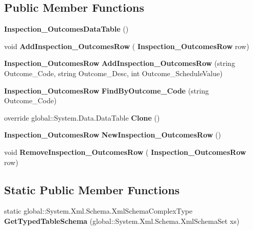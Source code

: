 \subsection*{Public Member Functions}
\begin{DoxyCompactItemize}
\item 
\textbf{ Inspection\+\_\+\+Outcomes\+Data\+Table} ()
\item 
void \textbf{ Add\+Inspection\+\_\+\+Outcomes\+Row} (\textbf{ Inspection\+\_\+\+Outcomes\+Row} row)
\item 
\textbf{ Inspection\+\_\+\+Outcomes\+Row} \textbf{ Add\+Inspection\+\_\+\+Outcomes\+Row} (string Outcome\+\_\+\+Code, string Outcome\+\_\+\+Desc, int Outcome\+\_\+\+Schedule\+Value)
\item 
\textbf{ Inspection\+\_\+\+Outcomes\+Row} \textbf{ Find\+By\+Outcome\+\_\+\+Code} (string Outcome\+\_\+\+Code)
\item 
override global\+::\+System.\+Data.\+Data\+Table \textbf{ Clone} ()
\item 
\textbf{ Inspection\+\_\+\+Outcomes\+Row} \textbf{ New\+Inspection\+\_\+\+Outcomes\+Row} ()
\item 
void \textbf{ Remove\+Inspection\+\_\+\+Outcomes\+Row} (\textbf{ Inspection\+\_\+\+Outcomes\+Row} row)
\end{DoxyCompactItemize}
\subsection*{Static Public Member Functions}
\begin{DoxyCompactItemize}
\item 
static global\+::\+System.\+Xml.\+Schema.\+Xml\+Schema\+Complex\+Type \textbf{ Get\+Typed\+Table\+Schema} (global\+::\+System.\+Xml.\+Schema.\+Xml\+Schema\+Set xs)
\end{DoxyCompactItemize}
